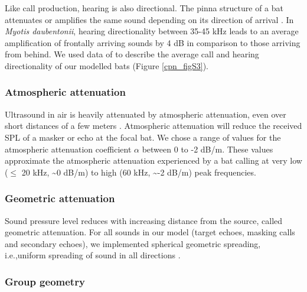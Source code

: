\documentclass[
]{book}
\begin{document}
Like call production, hearing is also directional. The pinna structure of a bat
attenuates or amplifies the same sound depending on its direction of arrival \citep[\citet{f2008a}]{firzlaff2003a}. In \emph{Myotis daubentonii}, hearing directionality between 35-45 kHz leads to an average amplification of frontally arriving sounds by 4 dB in comparison to those arriving from behind. We used data of \citet{giuggioli2015a} to describe the average call and hearing directionality of our modelled bats (Figure \ref{cpn_figS3}).

\hypertarget{atmospheric-attenuation}{%
\subsubsection{\texorpdfstring{Atmospheric attenuation \label{cpn_atmabs}}{Atmospheric attenuation }}\label{atmospheric-attenuation}}

Ultrasound in air is heavily attenuated by atmospheric attenuation, even over short distances of a few meters \citep[\citet{lawrence1982a}]{h2018a}. Atmospheric attenuation will reduce the received SPL of a masker or echo at the focal bat. We chose a range of values for the atmospheric attenuation coefficient \(\alpha\) between 0 to -2 dB/m. These values approximate the atmospheric attenuation experienced by a bat calling at very low (\(\leq\) 20 kHz, \textasciitilde0 dB/m) to high (60 kHz, \textasciitilde-2 dB/m) peak frequencies.

\hypertarget{geometric-attenuation}{%
\subsubsection{\texorpdfstring{Geometric attenuation \label{cpn_geomattn}}{Geometric attenuation }}\label{geometric-attenuation}}

Sound pressure level reduces with increasing distance from the source, called geometric attenuation. For all sounds in our model (target echoes, masking calls and secondary echoes), we implemented spherical geometric spreading, i.e.,uniform spreading of sound in all directions \citep{speaks1996a}.

\hypertarget{group-geometry}{%
\subsubsection{\texorpdfstring{Group geometry \label{cpn_groupgeom}}{Group geometry }}\label{group-geometry}}
\end{document}
